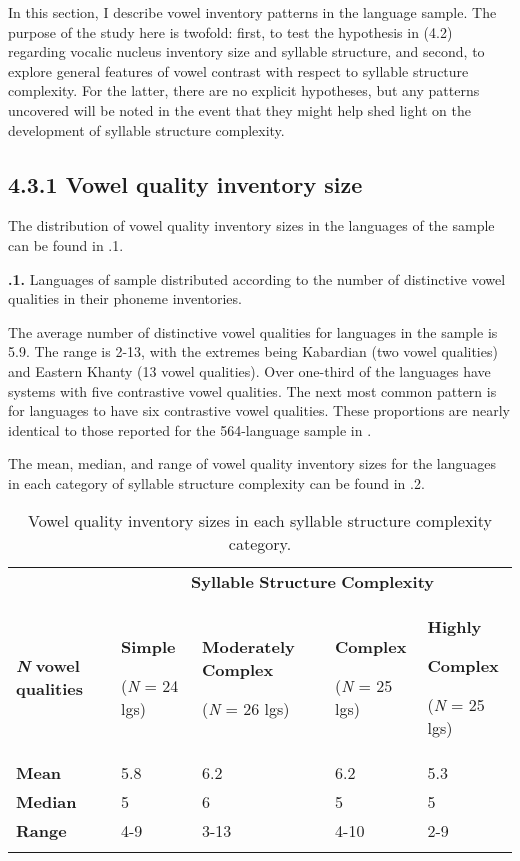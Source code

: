   In this section, I describe vowel inventory patterns in the language sample. The purpose of the study here is twofold: first, to test the hypothesis in (4.2) regarding vocalic nucleus inventory size and syllable structure, and second, to explore general features of vowel contrast with respect to syllable structure complexity. For the latter, there are no explicit hypotheses, but any patterns uncovered will be noted in the event that they might help shed light on the development of syllable structure complexity.

\subsection{4.3.1 Vowel quality inventory size}

  The distribution of vowel quality inventory sizes in the languages of the sample can be found in .1.

\textbf{.1.} Languages of sample distributed according to the number of distinctive vowel qualities in their phoneme inventories.

  The average number of distinctive vowel qualities for languages in the sample is 5.9. The range is 2-13, with the extremes being Kabardian (two vowel qualities) and Eastern Khanty (13 vowel qualities). Over one-third  of the languages have systems with five contrastive vowel qualities. The next most common pattern is for languages to have six contrastive vowel qualities. These proportions are nearly identical to those reported for the 564-language sample in \citet{Maddieson2013c}.

  The mean, median, and range of vowel quality inventory sizes for the languages in each category of syllable structure complexity can be found in .2.

\begin{table}
\begin{tabularx}{\textwidth}{XXXXX}
 & \multicolumn{4}{c}{ \textbf{Syllable} \textbf{Structure} \textbf{Complexity}}\\
\lsptoprule
\textbf{\textit{N}} \textbf{vowel} \textbf{qualities} & { \textbf{Simple}}

 (\textit{N} = 24 lgs) & { \textbf{Moderately} \textbf{Complex}}

 (\textit{N} = 26 lgs) & { \textbf{Complex}}

 (\textit{N} = 25 lgs) & { \textbf{Highly} }

{ \textbf{Complex}}

 (\textit{N} = 25 lgs)\\
\textbf{Mean} & 5.8 & 6.2 & 6.2 & 5.3\\
\textbf{Median} & 5 & 6 & 5 & 5\\
\textbf{Range} & 4-9 & 3-13 & 4-10 & 2-9\\
\lspbottomrule
\end{tabularx}
\caption{\label{4.2}Vowel quality inventory sizes in each syllable structure complexity category.}
\end{table}

